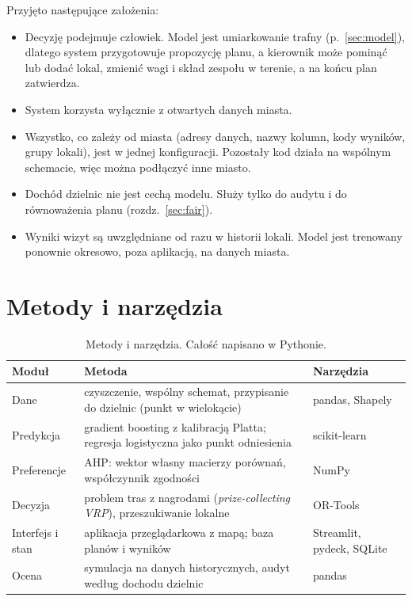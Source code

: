 \documentclass[11pt,a4paper]{article}
\begin{document}
Przyjęto następujące założenia:
\begin{itemize}
  \item Decyzję podejmuje człowiek. Model jest umiarkowanie trafny (p.~\ref{sec:model}),
        dlatego system przygotowuje propozycję planu, a kierownik może pominąć lub dodać lokal,
        zmienić wagi i skład zespołu w terenie, a na końcu plan zatwierdza.
  \item System korzysta wyłącznie z otwartych danych miasta.
  \item Wszystko, co zależy od miasta (adresy danych, nazwy kolumn, kody wyników, grupy lokali),
        jest w jednej konfiguracji. Pozostały kod działa na wspólnym schemacie, więc można
        podłączyć inne miasto.
  \item Dochód dzielnic nie jest cechą modelu. Służy tylko do audytu i do równoważenia planu
        (rozdz.~\ref{sec:fair}).
  \item Wyniki wizyt są uwzględniane od razu w historii lokali. Model jest trenowany ponownie
        okresowo, poza aplikacją, na danych miasta.
\end{itemize}

\section{Metody i narzędzia}

\begin{table}[ht]
\centering\small
\caption{Metody i narzędzia. Całość napisano w Pythonie.}
\label{tab:tools}
\begin{tabularx}{\textwidth}{@{}lXl@{}}
\toprule
Moduł & Metoda & Narzędzia \\
\midrule
Dane & czyszczenie, wspólny schemat, przypisanie do dzielnic (punkt w wielokącie) & pandas, Shapely \\
Predykcja & gradient boosting z kalibracją Platta; regresja logistyczna jako punkt odniesienia & scikit-learn \\
Preferencje & AHP: wektor własny macierzy porównań, współczynnik zgodności & NumPy \\
Decyzja & problem tras z nagrodami (\textit{prize-collecting VRP}), przeszukiwanie lokalne & OR-Tools \\
Interfejs i stan & aplikacja przeglądarkowa z mapą; baza planów i wyników & Streamlit, pydeck, SQLite \\
Ocena & symulacja na danych historycznych, audyt według dochodu dzielnic & pandas \\
\bottomrule
\end{tabularx}
\end{table}
\end{document}
